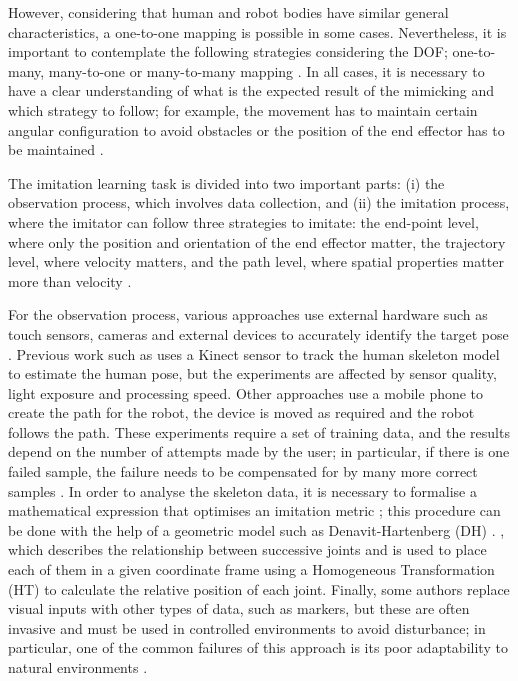 \documentclass[thesis]{mas_proposal}
\begin{document}
		However, considering that human and robot bodies have similar general characteristics, a one-to-one mapping is possible in some cases. Nevertheless, it is important to contemplate the following strategies considering the DOF; one-to-many, many-to-one or many-to-many mapping \cite{Alissandrakis2007}. In all cases, it is necessary to have a clear understanding of what is the expected result of the mimicking and which strategy to follow; for example, the movement has to maintain certain angular configuration to avoid obstacles or the position of the end effector has to be maintained \cite{Bandera2010, Shin2001}.
		
		The imitation learning task is divided into two important parts: (i) the observation process, which involves data collection, and (ii) the imitation process, where the imitator can follow three strategies to imitate: the end-point level, where only the position and orientation of the end effector matter, the trajectory level, where velocity matters, and the path level, where spatial properties matter more than velocity \cite{Alissandrakis2002}.
		
		For the observation process, various approaches use external hardware such as touch sensors, cameras and external devices to accurately identify the target pose \cite{Hua2021}. Previous work such as \cite{Itauma2012, Liu2015} uses a Kinect sensor to track the human skeleton model to estimate the human pose, but the experiments are affected by sensor quality, light exposure and processing speed. Other approaches use a mobile phone to create the path for the robot, the device is moved as required and the robot follows the path. These experiments require a set of training data, and the results depend on the number of attempts made by the user; in particular, if there is one failed sample, the failure needs to be compensated for by many more correct samples \cite{Mandlekar2018}. In order to analyse the skeleton data, it is necessary to formalise a mathematical expression that optimises an imitation metric \cite{Billard2004}; this procedure can be done with the help of a geometric model such as Denavit-Hartenberg (DH) \cite{Fadli2018}. \cite{Assad2020} \cite{VanPerre2015}, which describes the relationship between successive joints and is used to place each of them in a given coordinate frame using a Homogeneous Transformation (HT) to calculate the relative position of each joint. Finally, some authors replace visual inputs with other types of data, such as markers, but these are often invasive and must be used in controlled environments to avoid disturbance; in particular, one of the common failures of this approach is its poor adaptability to natural environments \cite{Mohammad2009, Dillmann2004}.
		
\end{document}
